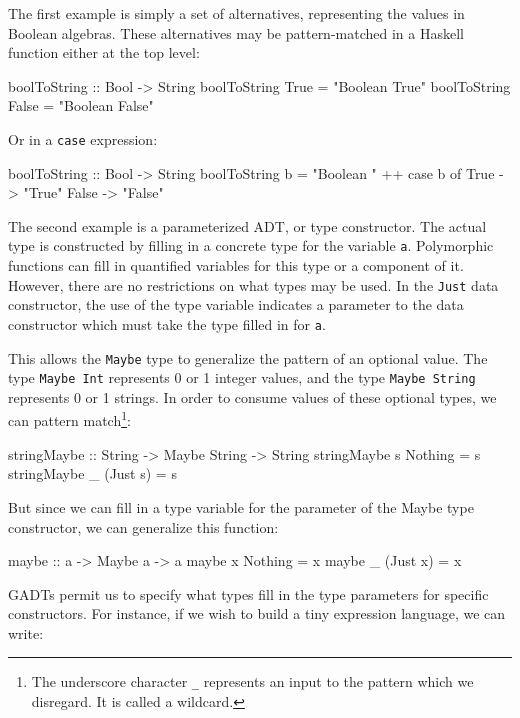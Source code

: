The first example is simply a set of alternatives, representing the values in
Boolean algebras. These alternatives may be pattern-matched in a Haskell
function either at the top level:

\begin{code}
boolToString :: Bool -> String
boolToString True  = "Boolean True"
boolToString False = "Boolean False"
\end{code}

Or in a {\tt case} expression:

\begin{code}
boolToString :: Bool -> String
boolToString b = "Boolean " ++ case b of
                                 True  -> "True"
                                 False -> "False"
\end{code}

The second example is a parameterized ADT, or type constructor. The actual type
is constructed by filling in a concrete type for the variable {\tt a}.
Polymorphic functions can fill in quantified variables for this type or a
component of it. However, there are no restrictions on what types may be used.
In the {\tt Just} data constructor, the use of the type variable indicates a
parameter to the data constructor which must take the type filled in for {\tt a}.

This allows the {\tt Maybe} type to generalize the pattern of an optional value.
The type {\tt Maybe Int} represents 0 or 1 integer values, and the type
{\tt Maybe String} represents 0 or 1 strings. In order to consume values of these
optional types, we can pattern match\footnote{The underscore character {\tt\_} 
represents an input to the pattern which we disregard. It is called a wildcard.}:

\begin{code}
stringMaybe :: String -> Maybe String -> String
stringMaybe s Nothing = s
stringMaybe _ (Just s)  = s
\end{code}

But since we can fill in a type variable for the parameter of the Maybe type
constructor, we can generalize this function:

\begin{code}
maybe :: a -> Maybe a -> a
maybe x Nothing  = x
maybe _ (Just x) = x
\end{code}

GADTs permit us to specify what types fill in the type parameters for specific
constructors. For instance, if we wish to build a tiny expression language,
we can write:

